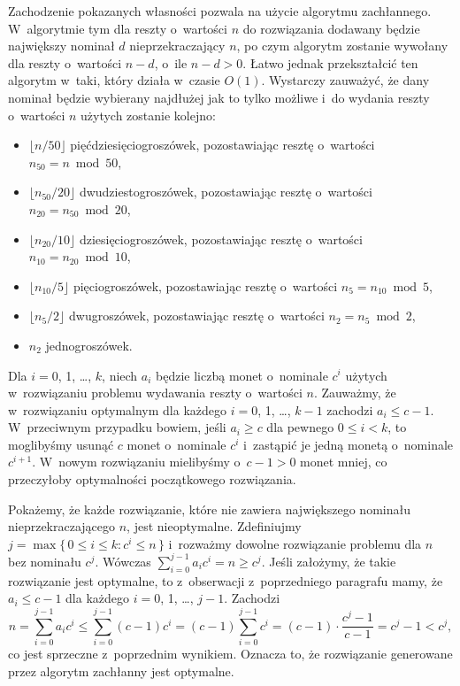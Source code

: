 Zachodzenie pokazanych własności pozwala na użycie algorytmu zachłannego.
W~algorytmie tym dla reszty o~wartości $n$ do rozwiązania dodawany będzie największy nominał $d$ nieprzekraczający $n$, po czym algorytm zostanie wywołany dla reszty o~wartości $n-d$, o~ile $n-d>0$.
Łatwo jednak przekształcić ten algorytm w~taki, który działa w~czasie $O(1)$.
Wystarczy zauważyć, że dany nominał będzie wybierany najdłużej jak to tylko możliwe i~do wydania reszty o~wartości $n$ użytych zostanie kolejno:
\begin{itemize}
	\item $\lfloor n/50\rfloor$ pięćdziesięciogroszówek, pozostawiając resztę o~wartości $n_{50}=n\bmod50$,
	\item $\lfloor n_{50}/20\rfloor$ dwudziestogroszówek, pozostawiając resztę o~wartości $n_{20}=n_{50}\bmod20$,
	\item $\lfloor n_{20}/10\rfloor$ dziesięciogroszówek, pozostawiając resztę o~wartości $n_{10}=n_{20}\bmod10$,
	\item $\lfloor n_{10}/5\rfloor$ pięciogroszówek, pozostawiając resztę o~wartości $n_5=n_{10}\bmod5$,
	\item $\lfloor n_5/2\rfloor$ dwugroszówek, pozostawiając resztę o~wartości $n_2=n_5\bmod2$,
	\item $n_2$ jednogroszówek.
\end{itemize}

\subproblem %
Dla $i=0$, 1, \dots, $k$, niech $a_i$ będzie liczbą monet o~nominale $c^i$ użytych w~rozwiązaniu problemu wydawania reszty o~wartości $n$.
Zauważmy, że w~rozwiązaniu optymalnym dla każdego $i=0$, 1, \dots, $k-1$ zachodzi $a_i\le c-1$.
W~przeciwnym przypadku bowiem, jeśli $a_i\ge c$ dla pewnego $0\le i<k$, to moglibyśmy usunąć $c$ monet o~nominale $c^i$ i~zastąpić je jedną monetą o~nominale $c^{i+1}$.
W~nowym rozwiązaniu mielibyśmy o~$c-1>0$ monet mniej, co przeczyłoby optymalności początkowego rozwiązania.

Pokażemy, że każde rozwiązanie, które nie zawiera największego nominału nieprzekraczającego $n$, jest nieoptymalne.
Zdefiniujmy $j=\max\{\,0\le i\le k:c^i\le n\,\}$ i~rozważmy dowolne rozwiązanie problemu dla $n$ bez nominału $c^j$.
Wówczas $\sum_{i=0}^{j-1}a_ic^i=n\ge c^j$.
Jeśli założymy, że takie rozwiązanie jest optymalne, to z~obserwacji z~poprzedniego paragrafu mamy, że $a_i\le c-1$ dla każdego $i=0$, 1, \dots, $j-1$.
Zachodzi
\[
	n = \sum_{i=0}^{j-1}a_ic^i \le \sum_{i=0}^{j-1}(c-1)c^i = (c-1)\sum_{i=0}^{j-1}c^i = (c-1)\cdot\frac{c^j-1}{c-1} = c^j-1 < c^j,
\]
co jest sprzeczne z~poprzednim wynikiem.
Oznacza to, że rozwiązanie generowane przez algorytm zachłanny jest optymalne.

